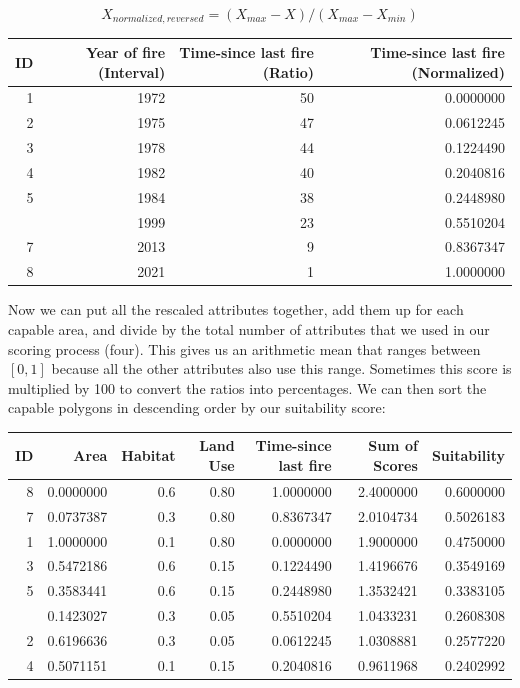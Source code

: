 \documentclass[
]{book}
\begin{document}
\[
X_{normalized,reversed} = (X_{max}-X)/(X_{max}-X_{min})
\]

\begin{tabular}{rrrr}
\toprule
ID & Year of fire (Interval) & Time-since last fire (Ratio) & Time-since last fire (Normalized)\\
\midrule
1 & 1972 & 50 & 0.0000000\\
2 & 1975 & 47 & 0.0612245\\
3 & 1978 & 44 & 0.1224490\\
4 & 1982 & 40 & 0.2040816\\
5 & 1984 & 38 & 0.2448980\\
\addlinespace
6 & 1999 & 23 & 0.5510204\\
7 & 2013 & 9 & 0.8367347\\
8 & 2021 & 1 & 1.0000000\\
\bottomrule
\end{tabular}

Now we can put all the rescaled attributes together, add them up for each capable area, and divide by the total number of attributes that we used in our scoring process (four). This gives us an arithmetic mean that ranges between \([0,1]\) because all the other attributes also use this range. Sometimes this score is multiplied by 100 to convert the ratios into percentages. We can then sort the capable polygons in descending order by our suitability score:

\begin{tabular}{rrrrrrr}
\toprule
ID & Area & Habitat & Land Use & Time-since last fire & Sum of Scores & Suitability\\
\midrule
8 & 0.0000000 & 0.6 & 0.80 & 1.0000000 & 2.4000000 & 0.6000000\\
7 & 0.0737387 & 0.3 & 0.80 & 0.8367347 & 2.0104734 & 0.5026183\\
1 & 1.0000000 & 0.1 & 0.80 & 0.0000000 & 1.9000000 & 0.4750000\\
3 & 0.5472186 & 0.6 & 0.15 & 0.1224490 & 1.4196676 & 0.3549169\\
5 & 0.3583441 & 0.6 & 0.15 & 0.2448980 & 1.3532421 & 0.3383105\\
\addlinespace
6 & 0.1423027 & 0.3 & 0.05 & 0.5510204 & 1.0433231 & 0.2608308\\
2 & 0.6196636 & 0.3 & 0.05 & 0.0612245 & 1.0308881 & 0.2577220\\
4 & 0.5071151 & 0.1 & 0.15 & 0.2040816 & 0.9611968 & 0.2402992\\
\bottomrule
\end{tabular}
\end{document}
